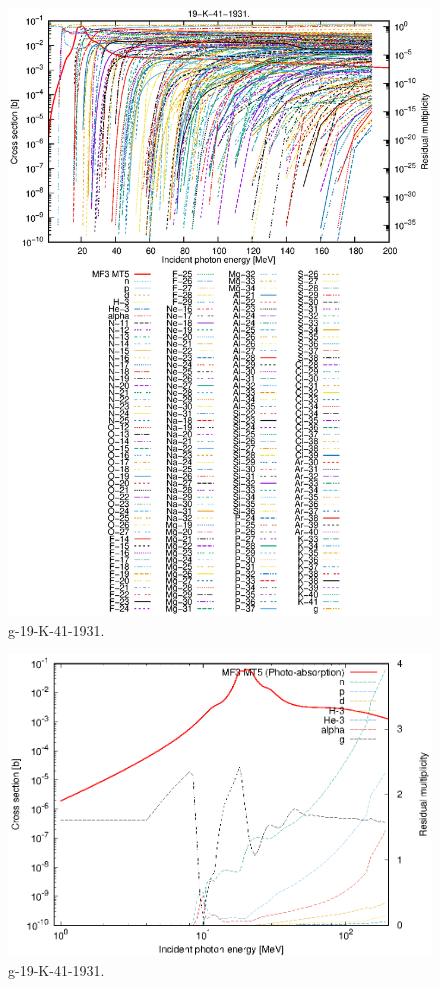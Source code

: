 \begin{figure}
 \includegraphics[width=\linewidth]{eps/g_19-K-41_1931.eps}
  \caption{g-19-K-41-1931.}
\end{figure}
\newpage \clearpage

\begin{figure}
 \includegraphics[width=\linewidth]{eps-log/g_19-K-41_1931.eps}
 \caption{g-19-K-41-1931.}
\end{figure}
\newpage \clearpage

